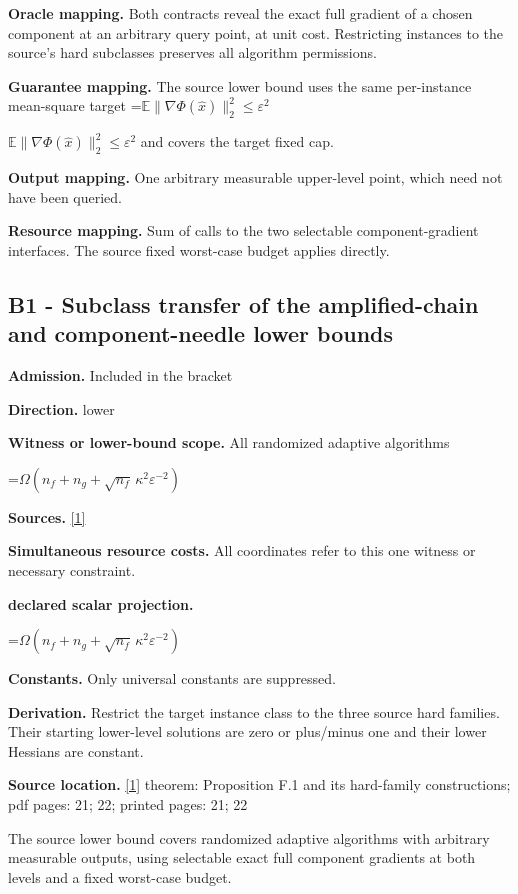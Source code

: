 \documentclass[10pt,a4paper]{article}
\newcommand{\AtlasMath}[1]{\par\begingroup\centering\setbox0=\hbox{$\displaystyle #1$}\ifdim\wd0>1.4\linewidth\typeout{ATLAS WIDE FORMULA: \the\wd0}\fi\ifdim\wd0>\linewidth\resizebox{\linewidth}{!}{\box0}\else\box0\fi\par\endgroup}
\newcommand{\AtlasInlineMath}[1]{\begingroup\setbox0=\hbox{$#1$}\ifdim\wd0>.4\linewidth\endgroup\AtlasMath{#1}\else\endgroup$#1$\fi}
\begin{document}
\textbf{Oracle mapping.} Both contracts reveal the exact full gradient of a chosen component at an arbitrary query point, at unit cost. Restricting instances to the source's hard subclasses preserves all algorithm permissions.

\textbf{Guarantee mapping.} The source lower bound uses the same per-instance mean-square target \AtlasInlineMath{\mathbb E\|\nabla\Phi(\widehat{x})\|_2^2\le\varepsilon^2} and covers the target fixed cap.

\textbf{Output mapping.} One arbitrary measurable upper-level point, which need not have been queried.

\textbf{Resource mapping.} Sum of calls to the two selectable component-gradient interfaces. The source fixed worst-case budget applies directly.

\subsection{B1 - Subclass transfer of the amplified-chain and component-needle lower bounds}
\textbf{Admission.} Included in the bracket

\textbf{Direction.} lower

\textbf{Witness or lower-bound scope.} All randomized adaptive algorithms

\AtlasMath{\Omega\!\left(n_f+n_g+\sqrt{n_f}\,\kappa^2\varepsilon^{-2}\right)}
\textbf{Sources.} \href{https://arxiv.org/pdf/2610.24538v1}{[1]}

\textbf{Simultaneous resource costs.} All coordinates refer to this one witness or necessary constraint.

\textbf{declared scalar projection.}

\AtlasMath{\Omega\!\left(n_f+n_g+\sqrt{n_f}\,\kappa^2\varepsilon^{-2}\right)}
\textbf{Constants.} Only universal constants are suppressed.

\textbf{Derivation.} Restrict the target instance class to the three source hard families. Their starting lower-level solutions are zero or plus/minus one and their lower Hessians are constant.

\textbf{Source location.} \href{https://arxiv.org/pdf/2610.24538v1}{[1]} theorem: Proposition F.1 and its hard-family constructions; pdf pages: 21; 22; printed pages: 21; 22

The source lower bound covers randomized adaptive algorithms with arbitrary measurable outputs, using selectable exact full component gradients at both levels and a fixed worst-case budget.
\end{document}
